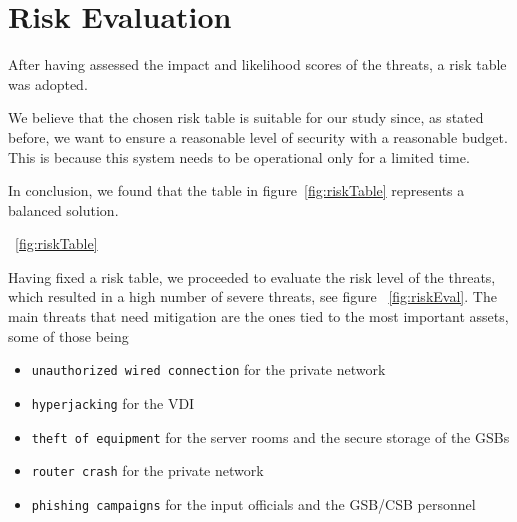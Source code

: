 \section*{Risk Evaluation}

After having assessed the impact and likelihood scores of the threats, a risk table was adopted. 

We believe that the chosen risk table is suitable for our study since, as stated before, we want to ensure a reasonable level of security with a reasonable budget. This is because this system needs to be operational only for a limited time.

In conclusion, we found that the table in figure~\ref{fig:riskTable} represents a balanced solution.

~\ref{fig:riskTable}

Having fixed a risk table, we proceeded to evaluate the risk level of the threats, which resulted in a high number of severe threats, see figure ~\ref{fig:riskEval}. The main threats that need mitigation are the ones tied to the most important assets, some of those being

\begin{itemize}
    \item \texttt{unauthorized wired connection} for the private network
    \item \texttt{hyperjacking} for the VDI
    \item \texttt{theft of equipment} for the server rooms and the secure storage of the GSBs
    \item \texttt{router crash} for the private network
    \item \texttt{phishing campaigns} for the input officials and the GSB/CSB personnel
\end{itemize}

